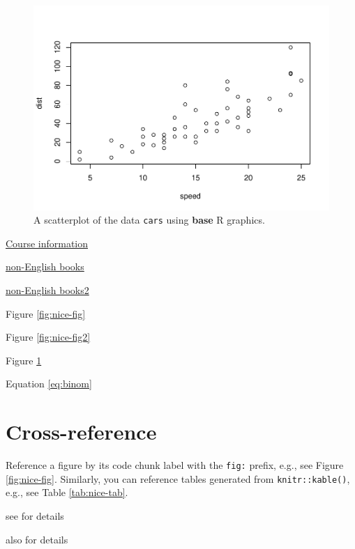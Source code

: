 \documentclass[
]{book}
\begin{document}
\begin{figure}
\centering
\includegraphics{02_Week_2_files/figure-latex/foo-1.pdf}
\caption{\label{fig:foo}A scatterplot of the data \texttt{cars} using \textbf{base} R graphics.}
\end{figure}

\protect\hyperlink{course-information}{Course information}

\protect\hyperlink{course-information}{non-English books}

\protect\hyperlink{equations}{non-English books2}

Figure \ref{fig:nice-fig}

Figure \ref{fig:nice-fig2}

Figure \ref{fig:foo}

Equation \eqref{eq:binom}

\hypertarget{cross-reference}{%
\section*{Cross-reference}\label{cross-reference}}

Reference a figure by its code chunk label with the \texttt{fig:} prefix, e.g., see Figure \ref{fig:nice-fig}. Similarly, you can reference tables generated from \texttt{knitr::kable()}, e.g., see Table \ref{tab:nice-tab}.

see \citet{R-base} for details

also \citet{R-bookdown} for details

  
\end{document}
